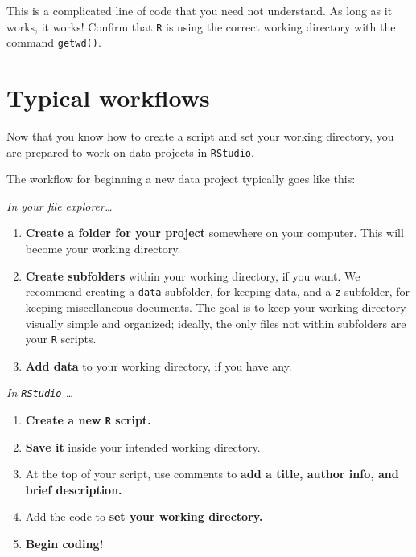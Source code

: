 \documentclass[]{book}
\begin{document}
This is a complicated line of code that you need not understand. As long as it works, it works! Confirm that \texttt{R} is using the correct working directory with the command \texttt{getwd()}.

\hypertarget{typical-workflows}{%
\section*{Typical workflows}\label{typical-workflows}}

Now that you know how to create a script and set your working directory, you are prepared to work on data projects in \texttt{RStudio}.

The workflow for beginning a new data project typically goes like this:

\emph{In your file explorer\ldots{}}

\begin{enumerate}
\def\labelenumi{\arabic{enumi}.}
\item
  \textbf{Create a folder for your project} somewhere on your computer. This will become your working directory.
\item
  \textbf{Create subfolders} within your working directory, if you want. We recommend creating a \texttt{data} subfolder, for keeping data, and a \texttt{z} subfolder, for keeping miscellaneous documents. The goal is to keep your working directory visually simple and organized; ideally, the only files not within subfolders are your \texttt{R} scripts.
\item
  \textbf{Add data} to your working directory, if you have any.
\end{enumerate}

\emph{In \texttt{RStudio} \ldots{}}

\begin{enumerate}
\def\labelenumi{\arabic{enumi}.}
\setcounter{enumi}{3}
\item
  \textbf{Create a new \texttt{R} script.}
\item
  \textbf{Save it} inside your intended working directory.
\item
  At the top of your script, use comments to \textbf{add a title, author info, and brief description.}
\item
  Add the code to \textbf{set your working directory.}
\item
  \textbf{Begin coding!}
\end{enumerate}
\end{document}
